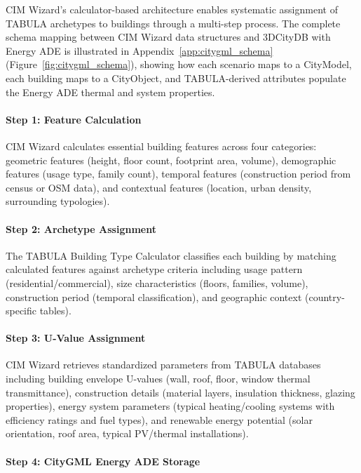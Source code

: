 CIM Wizard's calculator-based architecture enables systematic assignment of TABULA archetypes to buildings through a multi-step process. The complete schema mapping between CIM Wizard data structures and 3DCityDB with Energy ADE is illustrated in Appendix~\ref{app:citygml_schema} (Figure~\ref{fig:citygml_schema}), showing how each scenario maps to a CityModel, each building maps to a CityObject, and TABULA-derived attributes populate the Energy ADE thermal and system properties.

\paragraph{Step 1: Feature Calculation}

CIM Wizard calculates essential building features across four categories: geometric features (height, floor count, footprint area, volume), demographic features (usage type, family count), temporal features (construction period from census or OSM data), and contextual features (location, urban density, surrounding typologies).

\paragraph{Step 2: Archetype Assignment}

The TABULA Building Type Calculator classifies each building by matching calculated features against archetype criteria including usage pattern (residential/commercial), size characteristics (floors, families, volume), construction period (temporal classification), and geographic context (country-specific tables).

\paragraph{Step 3: U-Value Assignment}

CIM Wizard retrieves standardized parameters from TABULA databases including building envelope U-values (wall, roof, floor, window thermal transmittance), construction details (material layers, insulation thickness, glazing properties), energy system parameters (typical heating/cooling systems with efficiency ratings and fuel types), and renewable energy potential (solar orientation, roof area, typical PV/thermal installations).

\paragraph{Step 4: CityGML Energy ADE Storage}

